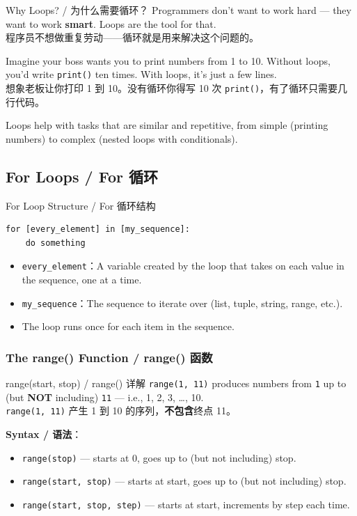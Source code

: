 \documentclass[11pt,a4paper]{report}
\let\oldtexttt\texttt
\renewcommand{\texttt}[1]{\textcolor{mainblue}{\oldtexttt{#1}}}
\begin{document}
\begin{concept}{Why Loops? / 为什么需要循环？}
    Programmers don't want to work hard — they want to work \textbf{smart}. Loops are the tool for that. \\
    程序员不想做重复劳动——循环就是用来解决这个问题的。

    Imagine your boss wants you to print numbers from 1 to 10. Without loops, you'd write \texttt{print()} ten times. With loops, it's just a few lines. \\
    想象老板让你打印 1 到 10。没有循环你得写 10 次 \texttt{print()}，有了循环只需要几行代码。

    Loops help with tasks that are similar and repetitive, from simple (printing numbers) to complex (nested loops with conditionals).
\end{concept}

\subsection{For Loops / For 循环}

\begin{concept}{For Loop Structure / For 循环结构}
    \begin{lstlisting}
for [every_element] in [my_sequence]:
    do something
    \end{lstlisting}
    \begin{itemize}[itemsep=0.3em]
        \item \texttt{every\_element}：A variable created by the loop that takes on each value in the sequence, one at a time.
        \item \texttt{my\_sequence}：The sequence to iterate over (list, tuple, string, range, etc.).
        \item The loop runs once for each item in the sequence.
    \end{itemize}
\end{concept}

\subsubsection{The range() Function / range() 函数}

\begin{concept}{range(start, stop) / range() 详解}
    \texttt{range(1, 11)} produces numbers from \texttt{1} up to (but \textbf{NOT} including) \texttt{11} — i.e., 1, 2, 3, …, 10. \\
    \texttt{range(1, 11)} 产生 1 到 10 的序列，\textbf{不包含}终点 11。

    \textbf{Syntax / 语法}：
    \begin{itemize}[itemsep=0.3em]
        \item \texttt{range(stop)} — starts at 0, goes up to (but not including) stop.
        \item \texttt{range(start, stop)} — starts at start, goes up to (but not including) stop.
        \item \texttt{range(start, stop, step)} — starts at start, increments by step each time.
    \end{itemize}
\end{concept}
\end{document}

